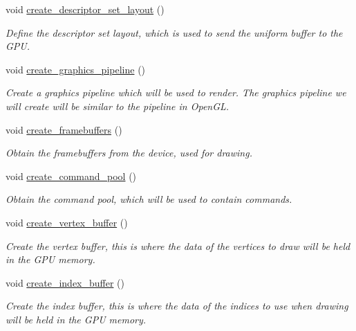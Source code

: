\begin{DoxyCompactItemize}
void \mbox{\hyperlink{classvulkan__application_a85db969a681ae5ee7e43080ade7b7769}{create\+\_\+descriptor\+\_\+set\+\_\+layout}} ()
\begin{DoxyCompactList}\small\item\em Define the descriptor set layout, which is used to send the uniform buffer to the G\+PU. \end{DoxyCompactList}\item 
void \mbox{\hyperlink{classvulkan__application_ae22774f6ddd3272d9f03fc3d0c8b7b56}{create\+\_\+graphics\+\_\+pipeline}} ()
\begin{DoxyCompactList}\small\item\em Create a graphics pipeline which will be used to render. The graphics pipeline we will create will be similar to the pipeline in Open\+GL. \end{DoxyCompactList}\item 
void \mbox{\hyperlink{classvulkan__application_a219950641fc50e873c559972448be53e}{create\+\_\+framebuffers}} ()
\begin{DoxyCompactList}\small\item\em Obtain the framebuffers from the device, used for drawing. \end{DoxyCompactList}\item 
void \mbox{\hyperlink{classvulkan__application_aee34ac075ae6ec39a8a431f21b0633b0}{create\+\_\+command\+\_\+pool}} ()
\begin{DoxyCompactList}\small\item\em Obtain the command pool, which will be used to contain commands. \end{DoxyCompactList}\item 
void \mbox{\hyperlink{classvulkan__application_ae4a77b3ff9b979777b6a81470c7c60d2}{create\+\_\+vertex\+\_\+buffer}} ()
\begin{DoxyCompactList}\small\item\em Create the vertex buffer, this is where the data of the vertices to draw will be held in the G\+PU memory. \end{DoxyCompactList}\item 
void \mbox{\hyperlink{classvulkan__application_a77a4cd2666406f254dc81d3131a47b22}{create\+\_\+index\+\_\+buffer}} ()
\begin{DoxyCompactList}\small\item\em Create the index buffer, this is where the data of the indices to use when drawing will be held in the G\+PU memory. \end{DoxyCompactList}\item 

\end{DoxyCompactItemize}
